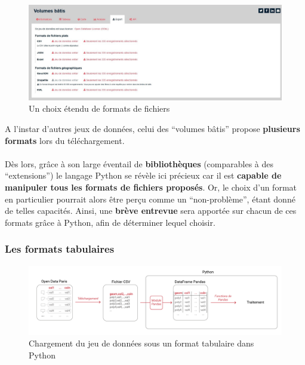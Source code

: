 \documentclass[
  11pt,
  french,
]{article}
\begin{document}
\begin{tcolorbox}
\begin{figure}

{\centering \includegraphics[width=0.9\linewidth]{__imgs/site_odp_formats} 

}

\caption[Un choix étendu de formats de fichiers  -  https://opendata.paris.fr/]{Un choix étendu de formats de fichiers}\label{fig:odp_formats}
\end{figure}
\end{tcolorbox}

A l'instar d'autres jeux de données, celui des ``volumes bâtis'' propose
\textbf{plusieurs formats} lors du téléchargement.\\
~\\
Dès lors, grâce à son large éventail de \textbf{bibliothèques}
(comparables à des ``extensions'') le langage Python se révèle ici
précieux car il est \textbf{capable de manipuler tous les formats de
fichiers proposés}. Or, le choix d'un format en particulier pourrait
alors être perçu comme un ``non-problème'', étant donné de telles
capacités. Ainsi, une \textbf{brève entrevue} sera apportée sur chacun
de ces formats grâce à Python, afin de déterminer lequel choisir.\\

\hypertarget{les-formats-tabulaires}{%
\subsubsection{Les formats tabulaires}\label{les-formats-tabulaires}}

\begin{tcolorbox}
\begin{figure}

{\centering \includegraphics[width=0.9\linewidth]{__imgs/io_csv} 

}

\caption[Chargement du jeu de données sous un format tabulaire dans Python  -  réalisation personnelle]{Chargement du jeu de données sous un format tabulaire dans Python}\label{fig:io_csv}
\end{figure}
\end{tcolorbox}
\end{document}
